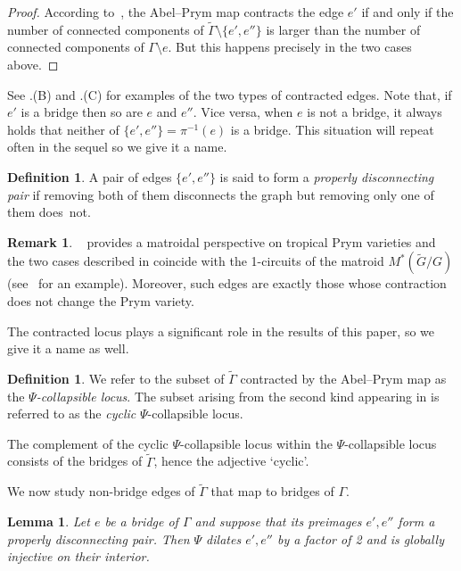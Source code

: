 \documentclass[11pt]{article}
\newtheorem{lemma}[theo]{Lemma}
\theoremstyle{definition}
\newtheorem{defi}[theo]{Definition}
\newtheorem{rema}[theo]{Remark}
\numberwithin{equation}{section}
\theoremstyle{definition}
\newcommand{\wt}[1]{\widetilde{#1}}
\begin{document}
\begin{proof}
According to~\cite[Theorem 4.1]{LZ22}, the Abel--Prym map contracts the edge $e'$ if and only if  the number     of connected components of $\wt\Gamma\setminus\{e',e''\}$ is larger than the number of connected components of $\Gamma\setminus{e}$. But this happens precisely in the two cases above.
\end{proof}

See .(B) and .(C) for examples of the two types of contracted edges. 
Note that, if $e'$ is a bridge then so are $e$ and $e''$. Vice versa, when $e$ is not a bridge, it  always holds that neither  of $\{e',e''\}=\pi^{-1}(e)$ is a bridge. This situation will repeat often in the sequel so we give it a name.   

\begin{defi}\label{def:propdiscpair}
    A pair of edges $\{e',e''\}$ is said to form a  \emph{properly disconnecting pair} if removing both of them disconnects the graph but removing only one of them does~not. 
\end{defi}


\begin{rema}
~\cite{RZ_matroidal} provides  a matroidal perspective on  tropical Prym varieties and the two cases described in  coincide with the 1-circuits of the matroid ${M}^*(\wt G/G)$ (see~\cite[Figure 3]{RZ_matroidal} for an example). Moreover, such edges are exactly those whose contraction does not change the Prym variety.
\end{rema}


The contracted locus plays a significant role in the results of this paper, so we give it a name as well. 
\begin{defi}
    We refer to the subset of $\wt\Gamma$ contracted by the Abel--Prym map  as the \emph{$\Psi$-collapsible locus}.  The subset arising from the second kind appearing in 
     is referred to as the \emph{cyclic} $\Psi$-collapsible locus. 
\end{defi}

The complement of the   cyclic $\Psi$-collapsible locus   within the $\Psi$-collapsible locus consists of the bridges of $\wt\Gamma$, hence the adjective `cyclic'. 

We now study non-bridge edges of $\wt\Gamma$ that map to bridges of $\Gamma$. 


\begin{lemma}\label{lem:edgeMappedWithMultiplicity2}
    Let $e$ be a bridge  of $\Gamma$ and suppose that its preimages  $e',e''$ form a properly disconnecting pair.  
    Then $\Psi$ dilates $e',e''$ by a factor of 2 and is globally injective on their interior.
    \end{lemma}
\end{document}
